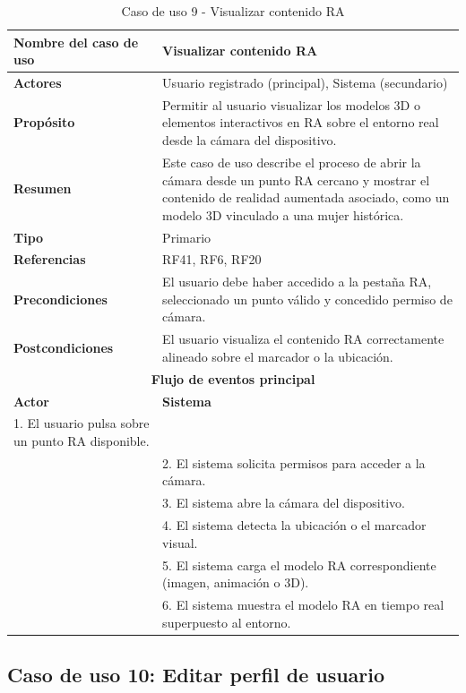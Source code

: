 \begin{table}[H]
\centering
\caption{Caso de uso 9 - Visualizar contenido RA}
\begin{tabular}{|p{4.5cm}|p{10.5cm}|}
\hline
\textbf{Nombre del caso de uso} & Visualizar contenido RA \\
\hline
\textbf{Actores} & Usuario registrado (principal), Sistema (secundario) \\
\hline
\textbf{Propósito} & Permitir al usuario visualizar los modelos 3D o elementos interactivos en RA sobre el entorno real desde la cámara del dispositivo. \\
\hline
\textbf{Resumen} & Este caso de uso describe el proceso de abrir la cámara desde un punto RA cercano y mostrar el contenido de realidad aumentada asociado, como un modelo 3D vinculado a una mujer histórica. \\
\hline
\textbf{Tipo} & Primario \\
\hline
\textbf{Referencias} & RF41, RF6, RF20 \\
\hline
\textbf{Precondiciones} & El usuario debe haber accedido a la pestaña RA, seleccionado un punto válido y concedido permiso de cámara. \\
\hline
\textbf{Postcondiciones} & El usuario visualiza el contenido RA correctamente alineado sobre el marcador o la ubicación. \\
\hline
\multicolumn{2}{|c|}{\textbf{Flujo de eventos principal}} \\
\hline
\textbf{Actor} & \textbf{Sistema} \\
\hline
1. El usuario pulsa sobre un punto RA disponible. & \\
\hline
& 2. El sistema solicita permisos para acceder a la cámara. \\
\hline
& 3. El sistema abre la cámara del dispositivo. \\
\hline
& 4. El sistema detecta la ubicación o el marcador visual. \\
\hline
& 5. El sistema carga el modelo RA correspondiente (imagen, animación o 3D). \\
\hline
& 6. El sistema muestra el modelo RA en tiempo real superpuesto al entorno. \\
\hline
\end{tabular}
\end{table}

\clearpage
\subsection{Caso de uso 10: Editar perfil de usuario}

